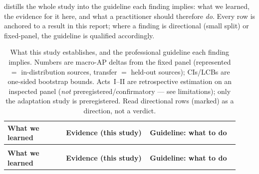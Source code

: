 \documentclass[11pt]{article}
\begin{document}
 distills the whole study into the guideline each finding implies: what we
learned, the evidence for it here, and what a practitioner should therefore \emph{do}. Every row is
anchored to a result in this report; where a finding is directional (small split) or fixed-panel, the
guideline is qualified accordingly.

\begingroup\small
\renewcommand{\arraystretch}{1.4}
\setlength{\extrarowheight}{2.5pt}
\begin{longtable}{@{}>{\raggedright\arraybackslash}p{0.235\linewidth} >{\raggedright\arraybackslash}p{0.335\linewidth} >{\raggedright\arraybackslash}p{0.35\linewidth}@{}}
\caption{What this study establishes, and the professional guideline each finding implies. Numbers are
macro-AP deltas from the fixed panel (represented $=$ in-distribution sources, transfer $=$ held-out
sources); CIs/LCBs are one-sided bootstrap bounds. Acts~I--II are retrospective estimation on an
inspected panel (\emph{not} preregistered/confirmatory --- see limitations); only the adaptation
study is preregistered. Read directional rows (marked) as a direction, not a verdict.}
\label{tab:guidelines}\\
\rowcolor{tkgreenedge}
{\color{white}\bfseries What we learned} & {\color{white}\bfseries Evidence (this study)} & {\color{white}\bfseries Guideline: what to do} \\
\endfirsthead
\multicolumn{3}{@{}l}{\small\itshape \Cref{tab:guidelines}, continued}\\
\rowcolor{tkgreenedge}
{\color{white}\bfseries What we learned} & {\color{white}\bfseries Evidence (this study)} & {\color{white}\bfseries Guideline: what to do} \\
\endhead


\end{longtable}
\end{document}
